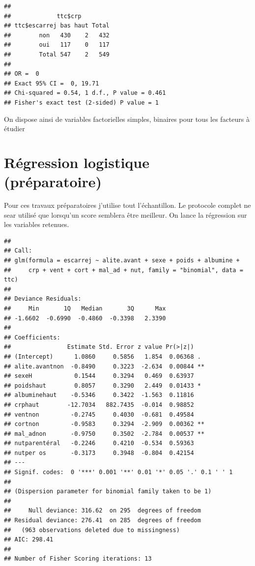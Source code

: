 \documentclass[a4paper, french]{article}
\begin{document}
\begin{verbatim}
## 
##             ttc$crp
## ttc$escarrej bas haut Total
##        non   430    2   432
##        oui   117    0   117
##        Total 547    2   549
## 
## OR =  0 
## Exact 95% CI =  0, 19.71  
## Chi-squared = 0.54, 1 d.f., P value = 0.461
## Fisher's exact test (2-sided) P value = 1
\end{verbatim}

On dispose ainsi de variables factorielles simples, binaires pour tous
les facteurs à étudier

\hypertarget{regression-logistique-preparatoire}{%
\section{Régression logistique
(préparatoire)}\label{regression-logistique-preparatoire}}

Pour ces travaux préparatoires j'utilise tout l'échantillon. Le
protocole complet ne sear utilisé que lorsqu'un score semblera être
meilleur. On lance la régression sur les variables retenues.

\begin{verbatim}
## 
## Call:
## glm(formula = escarrej ~ alite.avant + sexe + poids + albumine + 
##     crp + vent + cort + mal_ad + nut, family = "binomial", data = ttc)
## 
## Deviance Residuals: 
##     Min       1Q   Median       3Q      Max  
## -1.6602  -0.6990  -0.4860  -0.3398   2.3390  
## 
## Coefficients:
##                Estimate Std. Error z value Pr(>|z|)   
## (Intercept)      1.0860     0.5856   1.854  0.06368 . 
## alite.avantnon  -0.8490     0.3223  -2.634  0.00844 **
## sexeH            0.1544     0.3294   0.469  0.63937   
## poidshaut        0.8057     0.3290   2.449  0.01433 * 
## albuminehaut    -0.5346     0.3422  -1.563  0.11816   
## crphaut        -12.7034   882.7435  -0.014  0.98852   
## ventnon         -0.2745     0.4030  -0.681  0.49584   
## cortnon         -0.9583     0.3294  -2.909  0.00362 **
## mal_adnon       -0.9750     0.3502  -2.784  0.00537 **
## nutparentéral   -0.2246     0.4210  -0.534  0.59363   
## nutper os       -0.3173     0.3948  -0.804  0.42154   
## ---
## Signif. codes:  0 '***' 0.001 '**' 0.01 '*' 0.05 '.' 0.1 ' ' 1
## 
## (Dispersion parameter for binomial family taken to be 1)
## 
##     Null deviance: 316.62  on 295  degrees of freedom
## Residual deviance: 276.41  on 285  degrees of freedom
##   (963 observations deleted due to missingness)
## AIC: 298.41
## 
## Number of Fisher Scoring iterations: 13
\end{verbatim}
\end{document}
